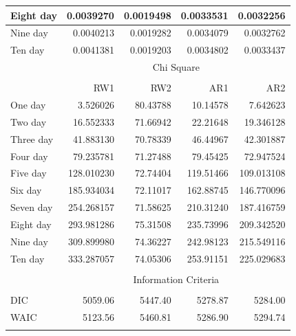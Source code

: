\documentclass[10pt,letterpaper]{article}
\begin{document}
\begin{table}[!h]
\begin{tabular}[t]{lrrrr}
	\hline
	Eight day & 0.0039270 & 0.0019498 & 0.0033531 & 0.0032256\\
	\hline
	Nine day & 0.0040213 & 0.0019282 & 0.0034079 & 0.0032762\\
	\hline
	Ten day & 0.0041381 & 0.0019203 & 0.0034802 & 0.0033437\\
	\hline
	& \multicolumn{4}{c}{Chi Square}\\
	\cline{2-5}\\
	& RW1 & RW2 & AR1 & AR2\\
	\hline
	One day & 3.526026 & 80.43788 & 10.14578 & 7.642623\\
	\hline
	Two day & 16.552333 & 71.66942 & 22.21648 & 19.346128\\
	\hline
	Three day & 41.883130 & 70.78339 & 46.44967 & 42.301887\\
	\hline
	Four day & 79.235781 & 71.27488 & 79.45425 & 72.947524\\
	\hline
	Five day & 128.010230 & 72.74404 & 119.51466 & 109.013108\\
	\hline
	Six day & 185.934034 & 72.11017 & 162.88745 & 146.770096\\
	\hline
	Seven day & 254.268157 & 71.58625 & 210.31240 & 187.416759\\
	\hline
	Eight day & 293.981286 & 75.31508 & 235.73996 & 209.342520\\
	\hline
	Nine day & 309.899980 & 74.36227 & 242.98123 & 215.549116\\
	\hline
	Ten day & 333.287057 & 74.05306 & 253.91151 & 225.029683\\
	\hline
		\hline\\
		& \multicolumn{4}{c}{Information Criteria}\\
		\hline\\
		DIC & 5059.06 & 5447.40 & 5278.87 & 5284.00\\
		WAIC & 5123.56 & 5460.81 & 5286.90 & 5294.74\\
		\hline\\
	\end{tabular}
\end{table}
\end{document}
